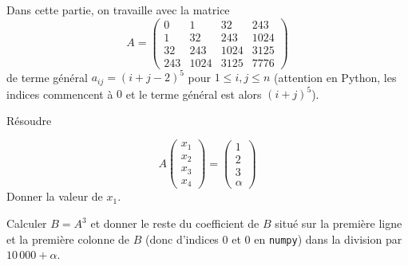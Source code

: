 
Dans cette partie, on travaille avec la matrice
\begin{equation*}
A=  \begin{pmatrix}
  0 & 1 & 32 & 243\\
  1 & 32 & 243 & 1024\\
  32 & 243 & 1024 & 3125\\
  243 & 1024 & 3125 & 7776
  \end{pmatrix}
\end{equation*}
de terme général $a_{ij}=(i+j-2)^{5}$ pour $1\leq i,j\leq n$
(attention en Python, les indices commencent à $0$ et le terme général
est alors $(i+j)^{5}$).


\question{} Résoudre

  \begin{equation*}
    A
    \begin{pmatrix}
      x_{1}\\x_{2}\\x_{3}\\x_{4}
    \end{pmatrix}
    =
    \begin{pmatrix}
      1\\ 2\\ 3\\ \alpha
    \end{pmatrix}
  \end{equation*}
  Donner la valeur de $x_{1}$.
  
  
  


\question{}
  Calculer $B = A^{3}$ et donner le reste du coefficient de $B$ situé
  sur la première ligne et la première colonne de $B$ (donc d'indices
  $0$ et $0$ en \texttt{numpy}) dans la division par $10\,000+\alpha$.


